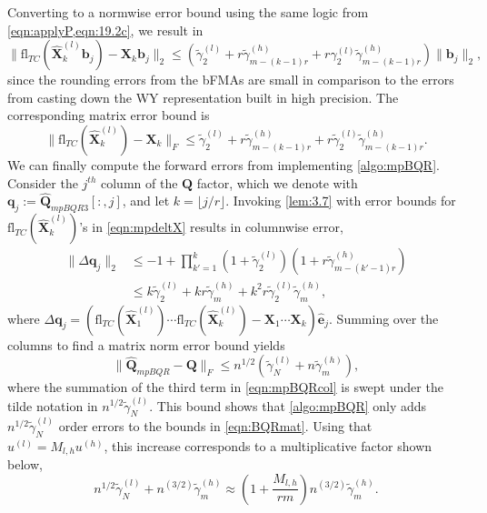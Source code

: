 \documentclass[review,onefignum,onetabnum]{siamart190516}
\newcommand{\bb}[1]{\mathbf{#1}}
\newcommand{\fl}{\mathrm{fl}}
\begin{document}
Converting to a normwise error bound using the same logic from \cref{eqn:applyP,eqn:19.2c}, we result in
\begin{equation}
\|\fl_{TC}(\hat{\bb{X}}_{k}^{(l)}\bb{b}_j)-\bb{X}_k\bb{b}_j\|_2 \leq (\tilde{\gamma}_2^{(l)} +r\tilde{\gamma}_{m-(k-1)r}^{(h)} + r\gamma_2^{(l)}\tilde{\gamma}_{m-(k-1)r}^{(h)}) \|\bb{b}_j\|_2, 
\end{equation}
since the rounding errors from the bFMAs are small in comparison to the errors from casting down the WY representation built in high precision.
The corresponding matrix error bound is
\begin{equation}
	\|\fl_{TC}(\hat{\bb{X}}_{k}^{(l)})-\bb{X}_k\|_F \leq \tilde{\gamma}_2^{(l)} +r\tilde{\gamma}_{m-(k-1)r}^{(h)} + r\tilde{\gamma}_2^{(l)}\tilde{\gamma}_{m-(k-1)r}^{(h)}.\label{eqn:mpdeltX}
\end{equation}
We can finally compute the forward errors from implementing \cref{algo:mpBQR}.
Consider the $j^{th}$ column of the $\bb{Q}$ factor, which we denote with $\bb{q}_j:=\hat{\bb{Q}}_{mpBQR3}[:,j]$, and let $k = \lfloor j/r\rfloor$.
Invoking \cref{lem:3.7} with error bounds for $\fl_{TC}(\hat{\bb{X}}_k^{(l)})$'s in \cref{eqn:mpdeltX} results in columnwise error,
\begin{align}
	\|\Delta \bb{q}_j \|_2 &\leq -1 + \prod_{k'=1}^k (1+\tilde{\gamma}_2^{(l)})(1+r\tilde{\gamma}_{m-(k'-1)r}^{(h)})\\ 
	&\leq k\tilde{\gamma}_{2}^{(l)} + kr\tilde{\gamma}_m^{(h)} + k^2r\tilde{\gamma}_{2}^{(l)}\tilde{\gamma}_m^{(h)}, \label{eqn:mpBQRcol}
\end{align} 
where $\Delta \bb{q}_j = (\fl_{TC}(\hat{\bb{X}}_1^{(l)})\cdots\fl_{TC}(\hat{\bb{X}}_k^{(l)}) - \bb{X}_1\cdots\bb{X}_k )\hat{\bb{e}}_j.$
Summing over the columns to find a matrix norm error bound yields
\begin{equation}
	\|\hat{\bb{Q}}_{mpBQR}-\bb{Q}\|_F \leq n^{1/2}\left(\tilde{\gamma}_{N}^{(l)} + n\tilde{\gamma}_m^{(h)}\right),
\end{equation}
where the summation of the third term in \cref{eqn:mpBQRcol} is swept under the tilde notation in $n^{1/2} \tilde{\gamma}_{N}^{(l)}$.
This bound shows that \cref{algo:mpBQR} only adds $n^{1/2}\tilde{\gamma}_{N}^{(l)}$ order errors to the bounds in \cref{eqn:BQRmat}.
Using that $u^{(l)}=M_{l,h}u^{(h)}$, this increase corresponds to a multiplicative factor shown below,
\begin{equation}
	n^{1/2}\tilde{\gamma}_{N}^{(l)} + n^{(3/2)}\tilde{\gamma}_m^{(h)} \approx \left(1+\frac{M_{l,h}}{rm}\right)n^{(3/2)}\tilde{\gamma}_m^{(h)}. \label{eqn:mpBQR3}
\end{equation}
\end{document}
